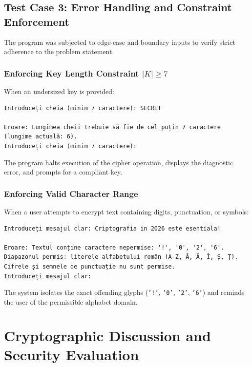 \documentclass[11pt,a4paper]{article}
\begin{document}
\subsection{Test Case 3: Error Handling and Constraint Enforcement}

The program was subjected to edge-case and boundary inputs to verify strict adherence to the problem statement.

\subsubsection{Enforcing Key Length Constraint \texorpdfstring{$|K| \ge 7$}{|K| >= 7}}
When an undersized key is provided:
\begin{lstlisting}[style=ciphertext]
Introduceți cheia (minim 7 caractere): SECRET

Eroare: Lungimea cheii trebuie să fie de cel puțin 7 caractere (lungime actuală: 6).
Introduceți cheia (minim 7 caractere): 
\end{lstlisting}
The program halts execution of the cipher operation, displays the diagnostic error, and prompts for a compliant key.

\subsubsection{Enforcing Valid Character Range}
When a user attempts to encrypt text containing digits, punctuation, or symbols:
\begin{lstlisting}[style=ciphertext]
Introduceți mesajul clar: Criptografia in 2026 este esentiala!

Eroare: Textul conține caractere nepermise: '!', '0', '2', '6'.
Diapazonul permis: literele alfabetului român (A-Z, Ă, Â, Î, Ș, Ț). Cifrele și semnele de punctuație nu sunt permise.
Introduceți mesajul clar: 
\end{lstlisting}
The system isolates the exact offending glyphs (\texttt{'!'}, \texttt{'0'}, \texttt{'2'}, \texttt{'6'}) and reminds the user of the permissible alphabet domain.

\newpage
\section{Cryptographic Discussion and Security Evaluation}
\end{document}
